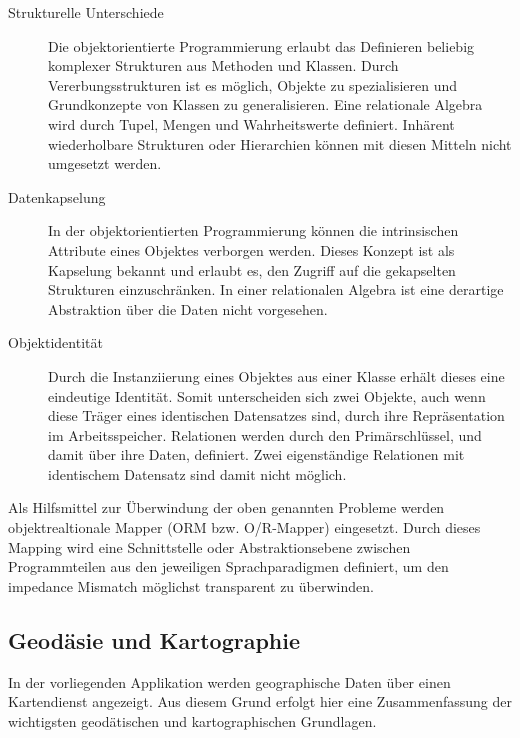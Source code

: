 \begin{description}
 \item [Strukturelle Unterschiede]
 Die objektorientierte Programmierung erlaubt das Definieren beliebig komplexer Strukturen aus Methoden und Klassen. Durch Vererbungsstrukturen ist es möglich, Objekte zu spezialisieren und Grundkonzepte von Klassen zu generalisieren. Eine relationale Algebra wird durch Tupel, Mengen und Wahrheitswerte definiert. Inhärent wiederholbare Strukturen oder Hierarchien können mit diesen Mitteln nicht umgesetzt werden.

 \item [Datenkapselung]
 In der objektorientierten Programmierung können die intrinsischen Attribute eines Objektes verborgen werden. Dieses Konzept ist als Kapselung bekannt und erlaubt es, den Zugriff auf die gekapselten Strukturen einzuschränken. In einer relationalen Algebra ist eine derartige Abstraktion über die Daten nicht vorgesehen.


 \item [Objektidentität]
 Durch die Instanziierung eines Objektes aus einer Klasse erhält dieses eine eindeutige Identität. Somit unterscheiden sich zwei Objekte, auch wenn diese Träger eines identischen Datensatzes sind, durch ihre Repräsentation im Arbeitsspeicher. Relationen werden durch den Primärschlüssel, und damit über ihre Daten, definiert. Zwei eigenständige Relationen mit identischem Datensatz sind damit nicht möglich.
\end{description}


Als Hilfsmittel zur Überwindung der oben genannten Probleme werden objektrealtionale Mapper (ORM bzw. O/R-Mapper) eingesetzt. Durch dieses Mapping wird eine Schnittstelle oder Abstraktionsebene zwischen Programmteilen aus den jeweiligen Sprachparadigmen definiert, um den impedance Mismatch möglichst transparent zu überwinden.






\subsection{Geodäsie und Kartographie}

In der vorliegenden Applikation werden geographische Daten über einen Kartendienst angezeigt. Aus diesem Grund erfolgt hier eine Zusammenfassung der wichtigsten geodätischen und kartographischen Grundlagen.
\\

